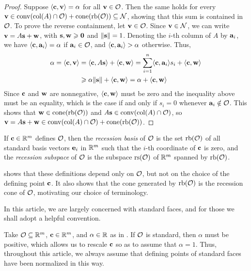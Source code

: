 \documentclass{amsart}
\begin{document}
\begin{proof}
   Suppose $\langle \mathbf{c}, \mathbf{v} \rangle = \alpha$ for all $\mathbf{v} \in \mathcal{O}$.
   Then the same holds for every $\mathbf{v} \in\operatorname{conv}( \operatorname{col}(A) \cap \mathcal{O} ) + \operatorname{cone}(\operatorname{rb}(\mathcal{O})) \subseteq \mathcal{N}$, showing that this sum is contained in  $\mathcal{O}$.
   To prove the reverse containment, let $\mathbf{v} \in \mathcal{O}$.
   Since $\mathbf{v} \in \mathcal{N}$, we can write $\mathbf{v} = A \mathbf{s} + \mathbf{w}$, with $\mathbf{s}, \mathbf{w}\geqslant \mathbf{0}$ and $\| \mathbf{s} \| = 1$.
   Denoting the $i$-th column of $A$ by $\mathbf{a}_i$, we have $\langle \mathbf{c}, \mathbf{a}_i \rangle = \alpha$ if $\mathbf{a}_i \in \mathcal{O}$, and $\langle \mathbf{c}, \mathbf{a}_i \rangle > \alpha$ otherwise.
   Thus, 
   \begin{align*}
     \alpha = \langle \mathbf{c}, \mathbf{v} \rangle &= \langle \mathbf{c}, A\mathbf{s} \rangle + \langle \mathbf{c}, \mathbf{w} \rangle
     = \sum_{i=1}^n \langle \mathbf{c}, \mathbf{a}_i \rangle s_i + \langle \mathbf{c}, \mathbf{w} \rangle\\
     &\geqslant \alpha \| \mathbf{s} \| + \langle \mathbf{c}, \mathbf{w} \rangle = \alpha + \langle \mathbf{c}, \mathbf{w} \rangle
   \end{align*}
   Since $\mathbf{c}$ and $\mathbf{w}$ are nonnegative, $\langle \mathbf{c}, \mathbf{w} \rangle$ must be zero and the inequality above must be an equality, which is the case if and only if $s_i = 0$ whenever $\mathbf{a}_i \notin \mathcal{O}$.
   This shows that $\mathbf{w} \in \operatorname{cone}(\operatorname{rb}(\mathcal{O}))$ and $A\mathbf{s} \in \operatorname{conv}(\operatorname{col}(A) \cap \mathcal{O})$, so $\mathbf{v} = A\mathbf{s} + \mathbf{w} \in \operatorname{conv}( \operatorname{col}(A) \cap \mathcal{O} ) + \operatorname{cone}(\operatorname{rb}(\mathcal{O}))$.
\end{proof}

\begin{definition}
   If $\mathbf{c} \in \mathbb{R}^m$ defines $\mathcal{O}$, then the \emph{recession basis} of $\mathcal{O}$ is the set $\operatorname{rb}(\mathcal{O})$ of all standard basis vectors $\mathbf{e}_i$ in $\mathbb{R}^m$ such that the $i$-th coordinate of $\mathbf{c}$ is zero, and the \emph{recession subspace} of $\mathcal{O}$ is the subspace $\operatorname{rs}(\mathcal{O})$ of $\mathbb{R}^m$ spanned by $\operatorname{rb}(\mathcal{O})$.
\end{definition}

 shows that these definitions depend only on $\mathcal{O}$, but not on the choice of the defining point $\mathbf{c}$.
It also shows that the cone generated by $\operatorname{rb}(\mathcal{O})$ is the recession cone of $\mathcal{O}$, motivating our choice of terminology.

In this article, we are largely concerned with standard faces, and for those we shall adopt a helpful convention.

\begin{convention}
\label{alpha=1: convention}
Take $\mathcal{O} \subseteq \mathbb{R}^m$, $\mathbf{c} \in \mathbb{R}^m$, and $\alpha \in \mathbb{R}$ as in .
If $\mathcal{O}$ is standard, then $\alpha$ must be positive, which allows us to rescale $\mathbf{c}$ so as to assume that $\alpha = 1$.
Thus, throughout this article, we always assume that defining points of standard faces have been normalized in this way.
\end{convention}
\end{document}
